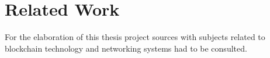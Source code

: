 \chapter{Related Work}
\label{ch:related}
For the elaboration of this thesis project sources with subjects related to blockchain technology and networking systems had to be consulted.